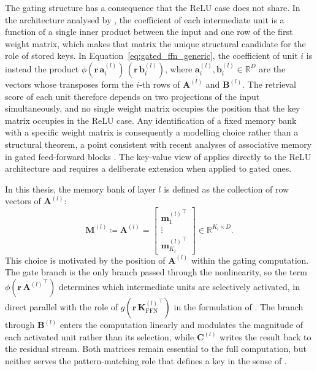 The gating structure has a consequence that the ReLU case does not share. In
the architecture analysed by \citet{geva2021transformer}, the coefficient of
each intermediate unit is a function of a single inner product between the
input and one row of the first weight matrix, which makes that matrix the
unique structural candidate for the role of stored keys. In
Equation~\eqref{eq:gated_ffn_generic}, the coefficient of unit $i$ is instead
the product $\phi(\mathbf{r}\,\mathbf{a}_i^{(l)})\,
(\mathbf{r}\,\mathbf{b}_i^{(l)})$, where
$\mathbf{a}_i^{(l)}, \mathbf{b}_i^{(l)} \in \mathbb{R}^{D}$ are the vectors
whose transposes form the $i$-th rows of $\mathbf{A}^{(l)}$ and
$\mathbf{B}^{(l)}$. The retrieval score of each unit therefore depends on two
projections of the input simultaneously, and no single weight matrix occupies
the position that the key matrix occupies in the ReLU case. Any identification
of a fixed memory bank with a specific weight matrix is consequently a
modelling choice rather than a structural theorem, a point consistent with
recent analyses of associative memory in gated feed-forward blocks
\citep{guptalinearly}. The key-value view of \citet{geva2021transformer}
applies directly to the ReLU architecture and requires a deliberate extension
when applied to gated ones.

In this thesis, the memory bank of layer $l$ is defined as the collection of
row vectors of $\mathbf{A}^{(l)}$:
\begin{equation}
    \mathbf{M}^{(l)} \coloneqq \mathbf{A}^{(l)}
    =
    \begin{bmatrix}
        {\mathbf{m}_1^{(l)}}^{\!\top} \\
        \vdots \\
        {\mathbf{m}_{K_l}^{(l)}}^{\!\top}
    \end{bmatrix}
    \in \mathbb{R}^{K_l \times D}.
    \label{eq:memory_bank_definition}
\end{equation}
This choice is motivated by the position of $\mathbf{A}^{(l)}$ within the
gating computation. The gate branch is the only branch passed through the
nonlinearity, so the term
$\phi(\mathbf{r}\,{\mathbf{A}^{(l)}}^{\!\top})$ determines which intermediate
units are selectively activated, in direct parallel with the role of
$g(\mathbf{r}\,{\mathbf{K}_{\mathrm{FFN}}^{(l)}}^{\!\top})$ in the formulation
of \citet{geva2021transformer}. The branch through $\mathbf{B}^{(l)}$ enters the
computation linearly and modulates the magnitude of each activated unit rather
than its selection, while $\mathbf{C}^{(l)}$ writes the result back to the
residual stream. Both matrices remain essential to the full computation, but
neither serves the pattern-matching role that defines a key in the sense of
\citet{geva2021transformer}.

